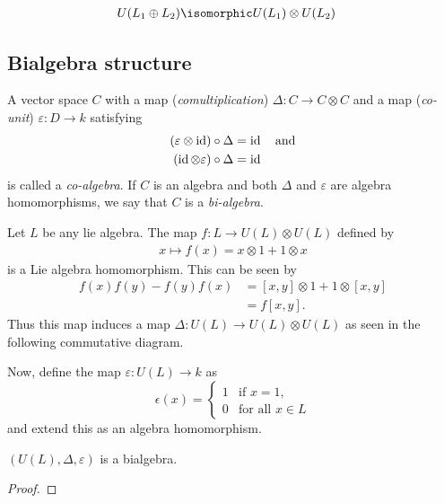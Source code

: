\begin{align}
    U(L_1\oplus L_2) &\isomorphic U(L_1) \otimes U(L_2)
\end{align}

\subsection{Bialgebra structure}
\label{sub:bialgebra_structure}
\begin{definition}[Bialgebra]
A vector space $C$ with a map (\emph{comultiplication}) $\Delta: C\to C\otimes C$ and a map (\emph{co-unit}) $\varepsilon: D\to k$ satisfying
\begin{align}
    (\varepsilon\otimes \operatorname{id}) \circ \Delta &= \operatorname{id} \quad\text{and} \\
    (\operatorname{id}\otimes \varepsilon) \circ \Delta &= \operatorname{id}
\end{align}
is called a \emph{co-algebra}. If $C$ is an algebra and both $\Delta$ and $\varepsilon$ are algebra homomorphisms, we say that $C$ is a \emph{bi-algebra}.
    
\end{definition}

Let $L$ be any lie algebra. The map $f: L\to U(L)\otimes U(L)$ defined by
\begin{align}
    x\mapsto f(x)=x\otimes 1 + 1\otimes x
\end{align}
is a Lie algebra homomorphism. This can be seen by
\begin{align}
    f(x)f(y)- f(y)f(x) &= [x,y]\otimes 1 + 1\otimes [x,y]\\
        &= f[x,y].
\end{align}
Thus this map induces a map $\Delta: U(L)\to U(L)\otimes U(L)$ as seen in the following commutative diagram.
\begin{center}
\end{center}
Now, define the map $\varepsilon: U(L)\to k$ as
\begin{equation}
    \epsilon(x) = \begin{cases} 
        1 &\text{if } x=1,\\
        0 &\text{for all } x\in L
    \end{cases}
\end{equation}
and extend this as an algebra homomorphism.
\begin{proposition}
   $(U(L), \Delta, \varepsilon)$  is a bialgebra.
\end{proposition}
\begin{proof}
\end{proof}


